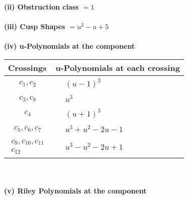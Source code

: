 \documentclass[1p]{elsarticle_modified}
\theoremstyle{definition}
\begin{document}
\flushleft \textbf{(ii) Obstruction class $= 1$}\\~\\
\flushleft \textbf{(iii) Cusp Shapes $= u^2- u+5$}\\~\\
\newpage\renewcommand{\arraystretch}{1}
\flushleft \textbf{(iv) u-Polynomials at the component}\newline \\
\begin{tabular}{m{50pt}|m{274pt}}
Crossings & \hspace{64pt}u-Polynomials at each crossing \\
\hline $$\begin{aligned}c_{1},c_{2}\end{aligned}$$&$\begin{aligned}
&(u-1)^3
\end{aligned}$\\
\hline $$\begin{aligned}c_{3},c_{8}\end{aligned}$$&$\begin{aligned}
&u^3
\end{aligned}$\\
\hline $$\begin{aligned}c_{4}\end{aligned}$$&$\begin{aligned}
&(u+1)^3
\end{aligned}$\\
\hline $$\begin{aligned}c_{5},c_{6},c_{7}\end{aligned}$$&$\begin{aligned}
&u^3+u^2-2 u-1
\end{aligned}$\\
\hline $$\begin{aligned}c_{9},c_{10},c_{11}\\c_{12}\end{aligned}$$&$\begin{aligned}
&u^3- u^2-2 u+1
\end{aligned}$\\
\hline
\end{tabular}\\~\\
\newpage\renewcommand{\arraystretch}{1}
\flushleft \textbf{(v) Riley Polynomials at the component}\newline \\
\end{document}
